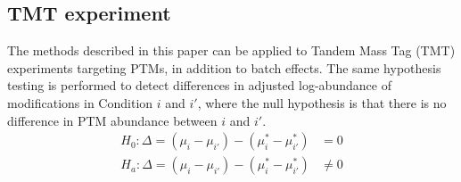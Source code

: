 \documentclass{mcp}
\begin{document}
%

\subsection{TMT experiment}
\label{sec:tmtmethod}

The methods described in this paper can be applied to Tandem Mass Tag (TMT) experiments targeting PTMs, in addition to batch effects. The same hypothesis testing is performed to detect differences in adjusted log-abundance of modifications in Condition $i$ and $i'$, where the null hypothesis is that there is no difference in PTM abundance between $i$ and $i'$. 
\begin{align*}
H_{0}: \Delta = (\mu_{i} - \mu_{i'}) - (\mu_{i}^{\ast} - \mu_{i'}^{\ast}) &= 0 \\
H_{a}: \Delta = (\mu_{i} - \mu_{i'}) - (\mu_{i}^{\ast} - \mu_{i'}^{\ast}) &\neq 0
\end{align*}
\end{document}
